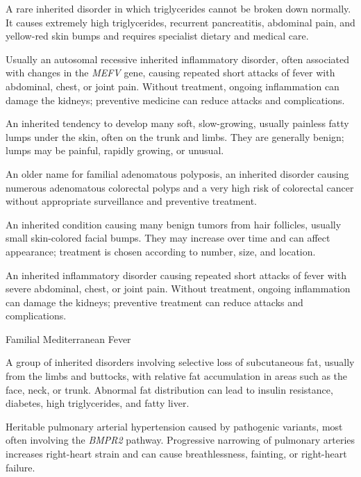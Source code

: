  A rare inherited disorder in which triglycerides cannot be broken down normally. It causes extremely high triglycerides, recurrent pancreatitis, abdominal pain, and yellow-red skin bumps and requires specialist dietary and medical care.

 Usually an autosomal recessive inherited inflammatory disorder, often associated with changes in the \textit{MEFV} gene, causing repeated short attacks of fever with abdominal, chest, or joint pain. Without treatment, ongoing inflammation can damage the kidneys; preventive medicine can reduce attacks and complications.

 An inherited tendency to develop many soft, slow-growing, usually painless fatty lumps under the skin, often on the trunk and limbs. They are generally benign; lumps may be painful, rapidly growing, or unusual.

 An older name for familial adenomatous polyposis, an inherited disorder causing numerous adenomatous colorectal polyps and a very high risk of colorectal cancer without appropriate surveillance and preventive treatment.

 An inherited condition causing many benign tumors from hair follicles, usually small skin-colored facial bumps. They may increase over time and can affect appearance; treatment is chosen according to number, size, and location.

 An inherited inflammatory disorder causing repeated short attacks of fever with severe abdominal, chest, or joint pain. Without treatment, ongoing inflammation can damage the kidneys; preventive treatment can reduce attacks and complications.

\synonyms
Familial Mediterranean Fever

 A group of inherited disorders involving selective loss of subcutaneous fat, usually from the limbs and buttocks, with relative fat accumulation in areas such as the face, neck, or trunk. Abnormal fat distribution can lead to insulin resistance, diabetes, high triglycerides, and fatty liver.

 Heritable pulmonary arterial hypertension caused by pathogenic variants, most often involving the \textit{BMPR2} pathway. Progressive narrowing of pulmonary arteries increases right-heart strain and can cause breathlessness, fainting, or right-heart failure.


